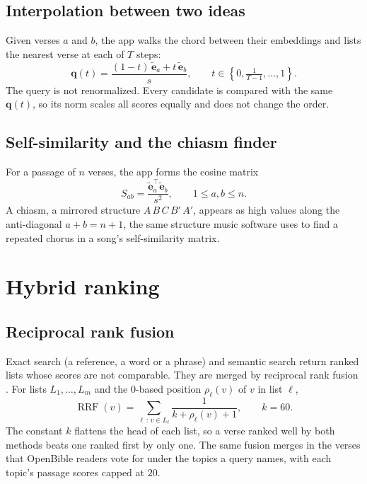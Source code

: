 \documentclass[11pt]{article}
\begin{document}
\subsection{Interpolation between two ideas}

Given verses $a$ and $b$, the app walks the chord between their embeddings and
lists the nearest verse at each of $T$ steps:
\begin{equation}
  \bm{q}(t) = \frac{(1-t)\,\tilde{\bm{e}}_a + t\,\tilde{\bm{e}}_b}{s}, \qquad
  t \in \left\{0, \tfrac{1}{T-1}, \dots, 1\right\}.
\end{equation}
The query is not renormalized. Every candidate is compared with the same
$\bm{q}(t)$, so its norm scales all scores equally and does not change the order.

\subsection{Self-similarity and the chiasm finder}

For a passage of $n$ verses, the app forms the cosine matrix
\begin{equation}
  S_{ab} = \frac{\tilde{\bm{e}}_a^\top \tilde{\bm{e}}_b}{s^2}, \qquad 1 \le a, b \le n.
\end{equation}
A chiasm, a mirrored structure $A\,B\,C\,B'\,A'$, appears as high values along
the anti-diagonal $a + b = n + 1$, the same structure music software uses to
find a repeated chorus in a song's self-similarity matrix.

\section{Hybrid ranking}\label{sec:ranking}

\subsection{Reciprocal rank fusion}

Exact search (a reference, a word or a phrase) and semantic search return
ranked lists whose scores are not comparable. They are merged by reciprocal
rank fusion \cite{rrf}. For lists $L_1, \dots, L_m$ and the $0$-based position
$\rho_\ell(v)$ of $v$ in list $\ell$,
\begin{equation}\label{eq:rrf}
  \operatorname{RRF}(v) = \sum_{\ell \,:\, v \in L_\ell} \frac{1}{k + \rho_\ell(v) + 1}, \qquad k = 60.
\end{equation}
The constant $k$ flattens the head of each list, so a verse ranked well by both
methods beats one ranked first by only one. The same fusion merges in the verses
that OpenBible readers vote for under the topics a query names, with each
topic's passage scores capped at $20$.
\end{document}
